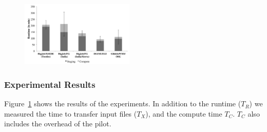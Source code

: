 \documentclass[conference]{IEEEtran}
\begin{document}





\begin{figure}[t]
 \up
 \centering
 \includegraphics[width=0.48\textwidth]{../perf/interop/128-bfast-egi-fg-xsede-osg-with-staging.pdf}
 \caption{\up\up}
\label{fig:perf_perf-bfast-bj}
\end{figure}


\subsubsection*{Experimental Results}

Figure~\ref{fig:perf_perf-bfast-bj} shows the results of the
experiments. In addition to the runtime ($T_R$) we
measured the time to transfer input files ($T_X$), and the compute 
time $T_C$. $T_C$ also includes the overhead of
the pilot.
\end{document}
